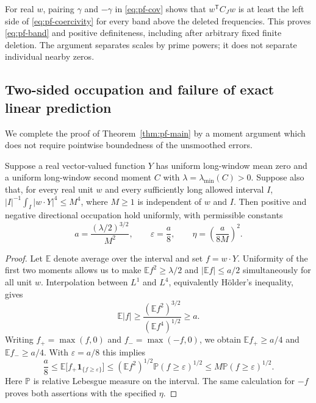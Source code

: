 For real $w$, pairing $\gamma$ and $-\gamma$ in
\eqref{eq:pf-cov} shows that $w^{\mathsf T}C_Jw$ is at least the
left side of \eqref{eq:pf-coercivity} for every band above the deleted
frequencies.  This proves \eqref{eq:pf-band} and positive
definiteness, including after arbitrary fixed finite deletion.  The
argument separates scales by prime powers; it does not separate
individual nearby zeros.

\subsection{Two-sided occupation and failure of exact linear prediction}
\label{subsec:pf-occupation}

We complete the proof of Theorem~\ref{thm:pf-main} by a moment
argument which does not require pointwise boundedness of the
unsmoothed errors.

\begin{lemma}
\label{lem:pf-occupation}
Suppose a real vector-valued function $Y$ has uniform long-window mean
zero and a uniform long-window second moment $C$ with
$\lambda=\lambda_{\min}(C)>0$.  Suppose also that, for every real
unit $w$ and every sufficiently long allowed interval $I$,
$|I|^{-1}\int_I|w\cdot Y|^4\leq M^4$, where $M\geq1$ is independent
of $w$ and $I$.  Then positive and negative directional occupation
hold uniformly, with permissible constants
\begin{equation}
\label{eq:pf-constants}
 a=\frac{(\lambda/2)^{3/2}}{M^2},
 \qquad \varepsilon=\frac a8,
 \qquad \eta=\left(\frac{a}{8M}\right)^2.
\end{equation}
\end{lemma}

\begin{proof}
Let $\mathbb E$ denote average over the interval and set $f=w\cdot Y$.
Uniformity of the first two moments allows us to make
$\mathbb Ef^2\geq\lambda/2$ and $|\mathbb Ef|\leq a/2$
simultaneously for all unit $w$.  Interpolation between $L^1$ and
$L^4$, equivalently H\"older's inequality, gives
\[
 \mathbb E|f|\geq
       \frac{(\mathbb Ef^2)^{3/2}}{(\mathbb Ef^4)^{1/2}}
       \geq a.
\]
Writing $f_+=\max(f,0)$ and $f_-=\max(-f,0)$, we obtain
$\mathbb Ef_+\geq a/4$ and $\mathbb Ef_-\geq a/4$.
With $\varepsilon=a/8$ this implies
\[
 \frac a8\leq\mathbb E\bigl[f_+\mathbf1_{\{f\geq\varepsilon\}}\bigr]
       \leq(\mathbb Ef^2)^{1/2}
                       \mathbb P(f\geq\varepsilon)^{1/2}
       \leq M\mathbb P(f\geq\varepsilon)^{1/2}.
\]
Here $\mathbb P$ is relative Lebesgue measure on the interval.
The same calculation for $-f$ proves both assertions with the
specified $\eta$.
\end{proof}

